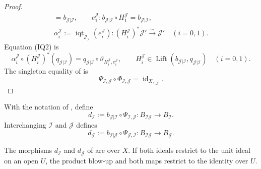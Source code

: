 \begin{proof}
\[\begin{gathered}
        =b_{\mathcal J|\mathcal I},\qquad
    e_1^{\mathcal J}\colon
      b_{\mathcal J|\mathcal I}\circ H_1^{\mathcal J}
        =b_{\mathcal J|\mathcal I},\\
    \alpha_i^{\mathcal J}
      :=\operatorname{iqt}_{\mathcal J_{\mathcal I}}(e_i^{\mathcal J})
        \colon(H_i^{\mathcal J})^*\mathcal J'
          \xrightarrow{\sim}\mathcal J'\quad(i=0,1).
  \end{gathered}                                                    \tag{PI6}
  \]
  Equation (IQ2) is
  \[
    \alpha_i^{\mathcal J}\circ
      (H_i^{\mathcal J})^*(q_{\mathcal J|\mathcal I})
      =q_{\mathcal J|\mathcal I}\circ
        \vartheta_{H_i^{\mathcal J},e_i^{\mathcal J}},
    \qquad
    H_i^{\mathcal J}\in
      \operatorname{Lift}(b_{\mathcal J|\mathcal I},
        q_{\mathcal J|\mathcal I})\quad(i=0,1).                  \tag{PI7}
  \]
  The singleton equality of
   is
  \[
    \Psi_{\mathcal I,\mathcal J}\circ\Phi_{\mathcal I,\mathcal J}
      =\operatorname{id}_{X_{\mathcal I,\mathcal J}}.
  \]
\end{proof}

\begin{definition}
  \label{def:nagata-blowup-product-domination-maps}
  \lean{}

  With the notation of
  , define
  \[
    d_{\mathcal I}:=
      b_{\mathcal J|\mathcal I}\circ\Psi_{\mathcal I,\mathcal J}\colon
      B_{\mathcal I\mathcal J}\longrightarrow B_{\mathcal I}.
  \]
  Interchanging $\mathcal I$ and $\mathcal J$ defines
  \[
    d_{\mathcal J}:=
      b_{\mathcal I|\mathcal J}\circ\Psi_{\mathcal J,\mathcal I}\colon
      B_{\mathcal I\mathcal J}\longrightarrow B_{\mathcal J}.
  \]
\end{definition}

\begin{corollary}
  \label{cor:nagata-blowup-product-common-refinement}
  \lean{}

  The morphisms $d_{\mathcal I}$ and $d_{\mathcal J}$ of
   are over
  $X$.  If both ideals restrict to the unit ideal on an open $U$, the product
  blow-up and both maps restrict to the identity over $U$.
\end{corollary}


